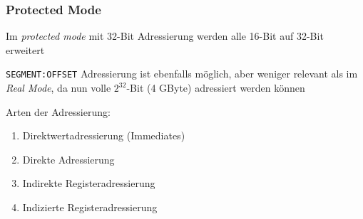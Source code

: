 \subsubsection{Protected Mode}
Im \emph{protected mode} mit 32-Bit Adressierung werden alle 16-Bit auf 32-Bit erweitert

\texttt{SEGMENT:OFFSET} Adressierung ist ebenfalls möglich, aber weniger relevant als im
\emph{Real Mode}, da nun volle $2^{32}$-Bit (4 GByte) adressiert werden können




Arten der Adressierung:

\begin{enumerate}
\item Direktwertadressierung (Immediates)
\item Direkte Adressierung
\item Indirekte Registeradressierung
\item Indizierte Registeradressierung
\end{enumerate}


